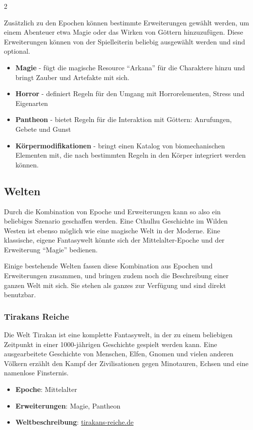 \begin{multicols}{2}
{Zusätzlich zu den Epochen können bestimmte Erweiterungen gewählt werden, um einem Abenteuer etwa Magie oder das Wirken von Göttern hinzuzufügen. Diese Erweiterungen können von der Spielleiterin beliebig ausgewählt werden und sind optional.
\begin{itemize}
    \item \textbf{Magie} - fügt die magische Resource ``Arkana'' für die Charaktere hinzu und bringt Zauber und Artefakte mit sich.
    \item \textbf{Horror} - definiert Regeln für den Umgang mit Horrorelementen, Stress und Eigenarten
    \item \textbf{Pantheon} - bietet Regeln für die Interaktion mit Göttern: Anrufungen, Gebete und Gunst
    \item \textbf{Körpermodifikationen} - bringt einen Katalog von biomechanischen Elementen mit, die nach bestimmten Regeln in den Körper integriert werden können.
\end{itemize}

\subsection{Welten}

Durch die Kombination von Epoche und Erweiterungen kann so also ein beliebiges Szenario geschaffen werden. Eine Cthulhu Geschichte im Wilden Westen ist ebenso möglich wie eine magische Welt in der Moderne. Eine klassische, eigene Fantasywelt könnte sich der Mittelalter-Epoche und der Erweiterung ``Magie'' bedienen.

Einige bestehende Welten fassen diese Kombination aus Epochen und Erweiterungen zusammen, und bringen zudem noch die Beschreibung einer ganzen Welt mit sich. Sie stehen als ganzes zur Verfügung und sind direkt benutzbar.

\subsubsection{Tirakans Reiche}

Die Welt Tirakan ist eine komplette Fantasywelt, in der zu einem beliebigen Zeitpunkt in einer 1000-jährigen Geschichte gespielt werden kann. Eine ausgearbeitete Geschichte von Menschen, Elfen, Gnomen und vielen anderen Völkern erzählt den Kampf der Zivilisationen gegen Minotauren, Echsen und eine namenlose Finsternis.
\begin{itemize}
    \item \textbf{Epoche}: Mittelalter
    \item \textbf{Erweiterungen}: Magie, Pantheon
    \item \textbf{Weltbeschreibung}: \href{https://tirakans-reiche.de}{tirakans-reiche.de}
\end{itemize}

}
\end{multicols}
